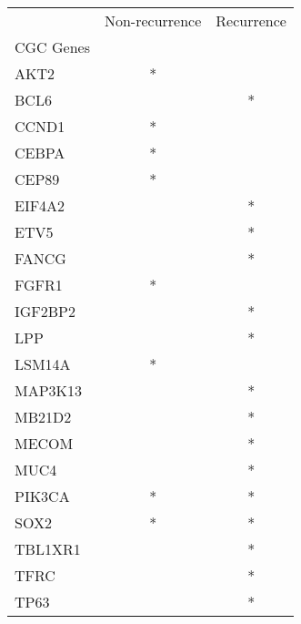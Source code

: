 \begin{tabular}{lcc}
\toprule
{} & Non-recurrence & Recurrence \\
CGC Genes &                &            \\
\midrule
AKT2      &              * &            \\
BCL6      &                &          * \\
CCND1     &              * &            \\
CEBPA     &              * &            \\
CEP89     &              * &            \\
EIF4A2    &                &          * \\
ETV5      &                &          * \\
FANCG     &                &          * \\
FGFR1     &              * &            \\
IGF2BP2   &                &          * \\
LPP       &                &          * \\
LSM14A    &              * &            \\
MAP3K13   &                &          * \\
MB21D2    &                &          * \\
MECOM     &                &          * \\
MUC4      &                &          * \\
PIK3CA    &              * &          * \\
SOX2      &              * &          * \\
TBL1XR1   &                &          * \\
TFRC      &                &          * \\
TP63      &                &          * \\
\bottomrule
\end{tabular}
